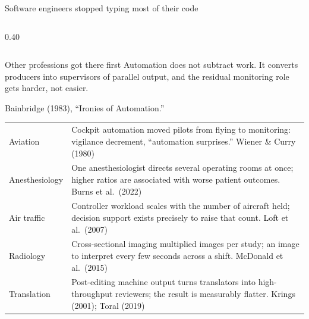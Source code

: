 \documentclass[aspectratio=169,10pt]{beamer}
\newcommand{\good}[1]{\textcolor{Sage}{#1}}
\newcommand{\warnc}[1]{\textcolor{Amber}{#1}}
\newcommand{\soft}[1]{\textcolor{InkSoft}{#1}}
\newcommand{\src}[1]{{\scriptsize\color{InkFaint}#1\par}}
\begin{document}
\begin{frame}{Software engineers stopped typing most of their code}
\begin{columns}[T]
\begin{column}{0.40\textwidth}
{%
      }
    \end{column}
  \end{columns}
\end{frame}

\begin{frame}{Other professions got there first}
  \small Automation does not subtract work. It converts
  \good{producers} into \warnc{supervisors of parallel output}, and the
  residual monitoring role gets harder, not easier.\par
  \src{Bainbridge (1983), ``Ironies of Automation.''}
  \vspace{1.5mm}
  \begin{tabular}{@{}p{}p{}@{}}
    \good{Aviation} & Cockpit automation moved pilots from flying to
      monitoring: vigilance decrement, ``automation surprises.''
      \soft{Wiener \& Curry (1980)} \\[2.5pt]
    \good{Anesthesiology} & One anesthesiologist directs several operating
      rooms at once; higher ratios are associated with worse patient
      outcomes. \soft{Burns et al.\ (2022)} \\[2.5pt]
    \good{Air traffic} & Controller workload scales with the number of
      aircraft held; decision support exists precisely to raise that count.
      \soft{Loft et al.\ (2007)} \\[2.5pt]
    \good{Radiology} & Cross-sectional imaging multiplied images per study;
      an image to interpret every few seconds across a shift.
      \soft{McDonald et al.\ (2015)} \\[2.5pt]
    \good{Translation} & Post-editing machine output turns translators into
      high-throughput reviewers; the result is measurably flatter.
      \soft{Krings (2001); Toral (2019)}
  \end{tabular}\par
\end{frame}
\end{document}

